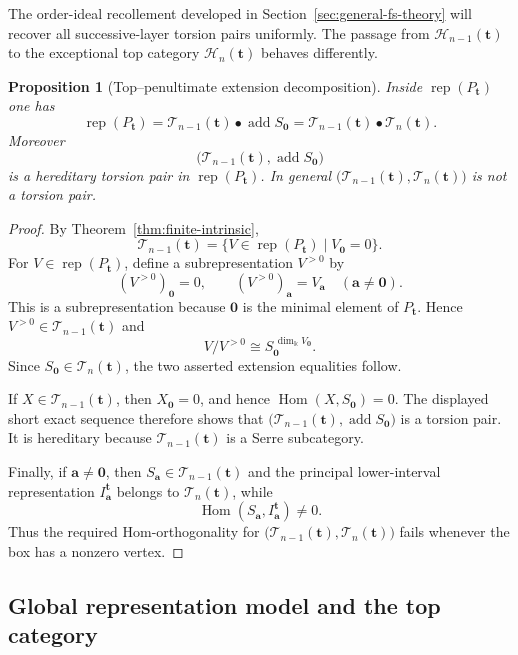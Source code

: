 \documentclass[12pt,reqno]{amsart}
\newtheorem{proposition}[theorem]{Proposition}
\theoremstyle{definition}
\theoremstyle{remark}
\newcommand{\Rep}{\operatorname{rep}}
\newcommand{\Hom}{\operatorname{Hom}}
\begin{document}
The order-ideal recollement developed in
Section~\ref{sec:general-fs-theory} will recover all successive-layer torsion
pairs uniformly.  The passage from $\mathcal H_{n-1}(\mathbf t)$ to the exceptional top category
$\mathcal H_n(\mathbf t)$ behaves differently.

\begin{proposition}[Top--penultimate extension decomposition]\label{prop:top-penultimate}
Inside $\Rep(P_{\mathbf t})$ one has
\[
\Rep(P_{\mathbf t})
=
\mathcal T_{n-1}(\mathbf t)\bullet\operatorname{add}S_{\mathbf0}
=
\mathcal T_{n-1}(\mathbf t)\bullet\mathcal T_n(\mathbf t).
\]
Moreover
\[
\bigl(\mathcal T_{n-1}(\mathbf t),\operatorname{add}S_{\mathbf0}\bigr)
\]
is a hereditary torsion pair in $\Rep(P_{\mathbf t})$.  In general
$\bigl(\mathcal T_{n-1}(\mathbf t),\mathcal T_n(\mathbf t)\bigr)$ is
not a torsion pair.
\end{proposition}

\begin{proof}
By Theorem~\ref{thm:finite-intrinsic},
\[
\mathcal T_{n-1}(\mathbf t)
=
\{V\in\Rep(P_{\mathbf t})\mid V_{\mathbf0}=0\}.
\]
For $V\in\Rep(P_{\mathbf t})$, define a subrepresentation $V^{>0}$ by
\[
(V^{>0})_{\mathbf0}=0,
\qquad
(V^{>0})_{\mathbf a}=V_{\mathbf a}
\quad(\mathbf a\ne\mathbf0).
\]
This is a subrepresentation because $\mathbf0$ is the minimal element of
$P_{\mathbf t}$.  Hence
$V^{>0}\in\mathcal T_{n-1}(\mathbf t)$ and
\[
V/V^{>0}\cong
S_{\mathbf0}^{\,\dim_\Bbbk V_{\mathbf0}}.
\]
Since $S_{\mathbf0}\in\mathcal T_n(\mathbf t)$, the two asserted
extension equalities follow.

If $X\in\mathcal T_{n-1}(\mathbf t)$, then $X_{\mathbf0}=0$, and hence
$\Hom(X,S_{\mathbf0})=0$.  The displayed short exact sequence therefore
shows that
$\bigl(\mathcal T_{n-1}(\mathbf t),\operatorname{add}S_{\mathbf0}\bigr)$
is a torsion pair.  It is hereditary because
$\mathcal T_{n-1}(\mathbf t)$ is a Serre subcategory.

Finally, if $\mathbf a\ne\mathbf0$, then
$S_{\mathbf a}\in\mathcal T_{n-1}(\mathbf t)$ and the principal
lower-interval representation
$I^{\mathbf t}_{\mathbf a}$ belongs to $\mathcal T_n(\mathbf t)$,
while
\[
\Hom(S_{\mathbf a},I^{\mathbf t}_{\mathbf a})\ne0.
\]
Thus the required Hom-orthogonality for
$\bigl(\mathcal T_{n-1}(\mathbf t),\mathcal T_n(\mathbf t)\bigr)$
fails whenever the box has a nonzero vertex.
\end{proof}


\subsection{Global representation model and the top category}\label{sec:global}
\end{document}
